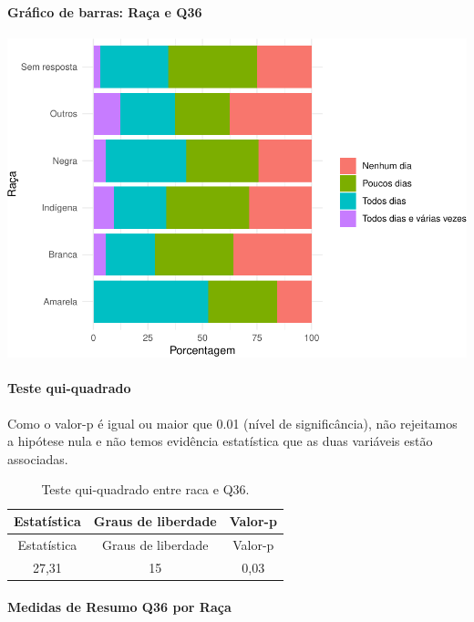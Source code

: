 \documentclass[]{article}
\let\oldparagraph\paragraph
\renewcommand{\paragraph}[1]{\oldparagraph{#1}\mbox{}}
\begin{document}
\hypertarget{gruxe1fico-de-barras-rauxe7a-e-q36}{%
\paragraph{Gráfico de barras: Raça e Q36}\label{gruxe1fico-de-barras-rauxe7a-e-q36}}

\begin{center}\includegraphics[width=0.75\linewidth]{relatorio_covid19_files/figure-latex/unnamed-chunk-1342-1} \end{center}

\hypertarget{teste-qui-quadrado-115}{%
\paragraph{Teste qui-quadrado}\label{teste-qui-quadrado-115}}

Como o valor-p é igual ou maior que 0.01 (nível de significância), não rejeitamos a hipótese nula e não temos evidência estatística que as duas variáveis estão associadas.

\begin{longtable}[]{@{}ccc@{}}
\caption{\label{tab:unnamed-chunk-1344}Teste qui-quadrado entre raca e Q36.}\tabularnewline
\toprule
Estatística & Graus de liberdade & Valor-p\tabularnewline
\midrule
\endfirsthead
\toprule
Estatística & Graus de liberdade & Valor-p\tabularnewline
\midrule
\endhead
27,31 & 15 & 0,03\tabularnewline
\bottomrule
\end{longtable}

\cleardoublepage

\hypertarget{medidas-de-resumo-q36-por-rauxe7a}{%
\paragraph{Medidas de Resumo Q36 por Raça}\label{medidas-de-resumo-q36-por-rauxe7a}}
\end{document}
